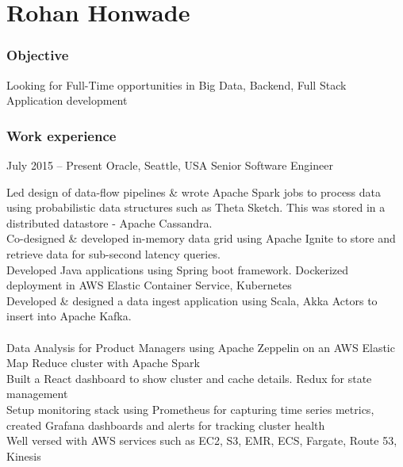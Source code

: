 \documentclass{tccv}
\begin{document}
\part{Rohan Honwade}

\section{Objective}
Looking for Full-Time opportunities in Big Data, Backend, Full Stack Application development

\section{Work experience}
\begin{eventlist}
\item{July 2015 -- Present}
     {Oracle, Seattle, USA}
     {Senior Software Engineer}

Led design of data-flow pipelines \& wrote Apache Spark jobs to process data using probabilistic data structures such as Theta Sketch. This was stored in a distributed datastore - Apache Cassandra.\\

Co-designed \& developed in-memory data grid using Apache Ignite to store and retrieve data for sub-second latency queries.\\

Developed Java applications using Spring boot framework. Dockerized deployment in AWS Elastic Container Service, Kubernetes\\

Developed \& designed a data ingest application using Scala, Akka Actors to insert into Apache Kafka.\\
\\

Data Analysis for Product Managers using Apache Zeppelin on an AWS Elastic Map Reduce cluster with Apache Spark\\

Built a React dashboard to show cluster and cache details. Redux for state management\\

Setup monitoring stack using Prometheus for capturing time series metrics, created Grafana dashboards and alerts for tracking cluster health\\

Well versed with AWS services such as EC2, S3, EMR, ECS, Fargate, Route 53, Kinesis


\end{eventlist}
\end{document}
